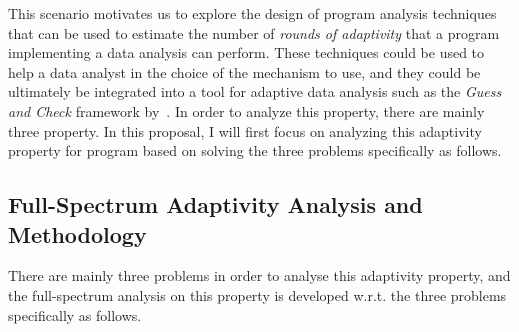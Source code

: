 This scenario motivates us to explore the design of program analysis techniques that can be used to estimate the number of \emph{rounds of adaptivity} that a program implementing a data analysis can perform. These techniques could be used to help a data analyst in the choice of the mechanism to use,
and they
could be ultimately be integrated into a tool for adaptive data analysis such as the \emph{Guess and Check} framework by~\cite{RogersRSSTW20}. 
%
In order to analyze this property, there are mainly three property. 
In this proposal, I will first focus on analyzing 
this adaptivity property for program based on solving the three problems specifically as follows.

\subsection{Full-Spectrum Adaptivity Analysis and Methodology}
\label{subsec:intro-adapt}
There are mainly three problems in order to analyse this adaptivity property, 
and the full-spectrum analysis on this property is 
developed w.r.t. the three problems specifically as follows.

